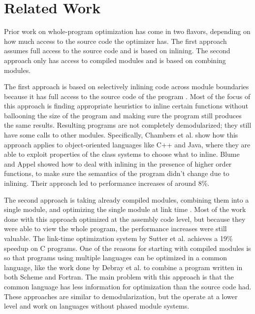 \chapter{Related Work}
Prior work on whole-program optimization has come in two flavors, depending on how much access to the source code the optimizer has. The first approach assumes full access to the source code and is based on inlining. The second approach only has access to compiled modules and is based on combining modules.

The first approach is based on selectively inlining code across module boundaries because it has full access to the source code of the program \cite{258960,Chambers96whole-programoptimization}. Most of the focus of this approach is finding appropriate heuristics to inline certain functions without ballooning the size of the program and making sure the program still produces the same results. Resulting programs are not completely demodularized; they still have some calls to other modules. Specifically, Chambers et al. \cite{Chambers96whole-programoptimization} show how this approach applies to object-oriented languages like C++ and Java, where they are able to exploit properties of the class systems to choose what to inline. Blume and Appel \cite{258960} showed how to deal with inlining in the presence of higher order functions, to make sure the semantics of the program didn't change due to inlining. Their approach led to performance increases of around 8\%.

The second approach is taking already compiled modules, combining them into a single module, and optimizing the single module at link time \cite{sutter,727617}. Most of the work done with this approach optimized at the assembly code level, but because they were able to view the whole program, the performance increases were still valuable. 
The link-time optimization system by Sutter et al. \cite{sutter} achieves a 19\% speedup on C programs.
One of the reasons for starting with compiled modules is so that programs using multiple languages can be optimized in a common language, like the work done by Debray et al. \cite{727617} to combine a program written in both Scheme and Fortran. The main problem with this approach is that the common language has less information for optimization than the source code had. 
These approaches are similar to demodularization, but the operate at a lower level and work on languages without phased module systems.

